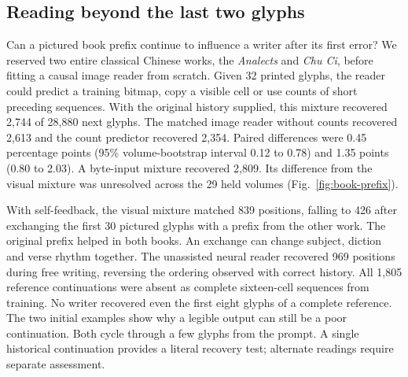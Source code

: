 \subsection*{Reading beyond the last two glyphs}
Can a pictured book prefix continue to influence a writer after its first error? We reserved two entire classical Chinese works, the \emph{Analects} and \emph{Chu Ci}, before fitting a causal image reader from scratch. Given 32 printed glyphs, the reader could predict a training bitmap, copy a visible cell or use counts of short preceding sequences. With the original history supplied, this mixture recovered 2,744 of 28,880 next glyphs. The matched image reader without counts recovered 2,613 and the count predictor recovered 2,354. Paired differences were 0.45 percentage points (95\% volume-bootstrap interval 0.12 to 0.78) and 1.35 points (0.80 to 2.03). A byte-input mixture recovered 2,809. Its difference from the visual mixture was unresolved across the 29 held volumes (Fig.~\ref{fig:book-prefix}).

With self-feedback, the visual mixture matched 839 positions, falling to 426 after exchanging the first 30 pictured glyphs with a prefix from the other work. The original prefix helped in both books. An exchange can change subject, diction and verse rhythm together. The unassisted neural reader recovered 969 positions during free writing, reversing the ordering observed with correct history. All 1,805 reference continuations were absent as complete sixteen-cell sequences from training. No writer recovered even the first eight glyphs of a complete reference. The two initial examples show why a legible output can still be a poor continuation. Both cycle through a few glyphs from the prompt. A single historical continuation provides a literal recovery test; alternate readings require separate assessment.
